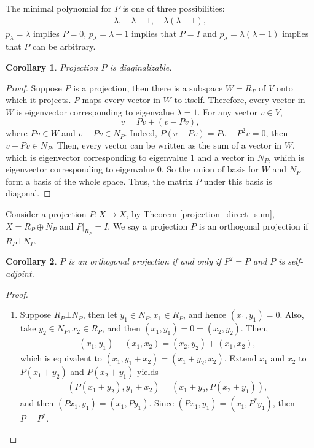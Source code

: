 \documentclass[11pt]{book}
\newtheorem{corollary}{Corollary}[theorem]
\theoremstyle{definition}
\numberwithin{equation}{chapter}
\begin{document}
\begin{subappendices}
The minimal polynomial for $P$ is one of three possibilities:
\begin{align*}
    \lambda, \quad \lambda - 1, \quad \lambda(\lambda - 1),
\end{align*}
$p_\lambda = \lambda$ implies $P = 0$, $p_\lambda = \lambda - 1$ implies that $P = I$ and $p_\lambda = \lambda(\lambda - 1)$ implies that $P$ can be arbitrary. 

\medskip

\begin{corollary}{\rm \cite{33}}
Projection $P$ is diaginalizable.
\end{corollary}
\begin{proof}
Suppose $P$ is a projection, then there is a subspace $W = R_P$ of $V$ onto which it projects. $P$ maps every vector in $W$ to itself. Therefore, every vector in $W$ is eigenvector corresponding to eigenvalue $\lambda = 1$. For any vector $v \in V$, 
$$v = Pv + (v - Pv),$$ 
where $Pv \in W$ and $v - Pv \in N_P$. Indeed, $P(v - Pv) = Pv - P^2 v = 0$, then $v - Pv \in N_P$. Then, every vector can be written as the sum of a vector in $W$, which is eigenvector corresponding to eigenvalue $1$ and a vector in $N_P$, which is eigenvector corresponding to eigenvalue $0$. So the union of basis for $W$ and $N_P$ form a basis of the whole space. Thus, the matrix $P$ under this basis is diagonal.
\end{proof}

\medskip

Consider a projection $P: X \to X$, by Theorem \ref{projection_direct_sum}, $X = R_P \oplus N_P$ and $P|_{R_P} = I$. We say a projection $P$ is an orthogonal projection if $R_P \bot N_P$.

\begin{corollary}
$P$ is an orthogonal projection if and only if $P^2 = P$ and $P$ is self-adjoint.
\end{corollary}
\begin{proof}
~\begin{enumerate}[label=(\alph*)]
    \item Suppose $R_P \bot N_P$, then let $y_1 \in N_P, x_1 \in R_P$, and hence $(x_1, y_1) = 0$. Also, take $y_2 \in N_P, x_2 \in R_P$, and then $(x_1, y_1) = 0 = (x_2, y_2)$. Then,
    \begin{align*}
        (x_1, y_1) + (x_1, x_2) = (x_2, y_2) + (x_1, x_2),
    \end{align*}
    which is equivalent to $(x_1, y_1 + x_2) = (x_1 + y_2, x_2)$. Extend $x_1$ and $x_2$ to $P(x_1 + y_2)$ and $P(x_2 + y_1)$\cite{34} yields 
    \begin{align*}
        (P(x_1 + y_2), y_1 + x_2) = (x_1 + y_2, P(x_2 + y_1)),
    \end{align*}
    and then $(Px_1, y_1) = (x_1, Py_1)$. Since $(Px_1, y_1) = (x_1, P^*y_1)$, then $P = P^*$.
    

\end{enumerate}
\end{proof}
\end{subappendices}
\end{document}
